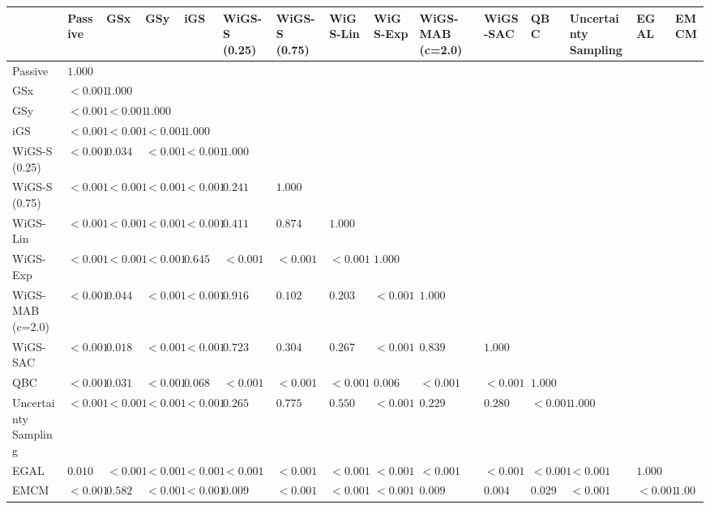 \begin{tabular}{lllllllllllllll}
\toprule
 & Passive & GSx & GSy & iGS & WiGS-S (0.25) & WiGS-S (0.75) & WiGS-Lin & WiGS-Exp & WiGS-MAB (c=2.0) & WiGS-SAC & QBC & Uncertainty Sampling & EGAL & EMCM \\
\midrule
Passive & $1.000$ &  &  &  &  &  &  &  &  &  &  &  &  &  \\
GSx & $<0.001$ & $1.000$ &  &  &  &  &  &  &  &  &  &  &  &  \\
GSy & $<0.001$ & $<0.001$ & $1.000$ &  &  &  &  &  &  &  &  &  &  &  \\
iGS & $<0.001$ & $<0.001$ & $<0.001$ & $1.000$ &  &  &  &  &  &  &  &  &  &  \\
WiGS-S (0.25) & $<0.001$ & $0.034$ & $<0.001$ & $<0.001$ & $1.000$ &  &  &  &  &  &  &  &  &  \\
WiGS-S (0.75) & $<0.001$ & $<0.001$ & $<0.001$ & $<0.001$ & $0.241$ & $1.000$ &  &  &  &  &  &  &  &  \\
WiGS-Lin & $<0.001$ & $<0.001$ & $<0.001$ & $<0.001$ & $0.411$ & $0.874$ & $1.000$ &  &  &  &  &  &  &  \\
WiGS-Exp & $<0.001$ & $<0.001$ & $<0.001$ & $0.645$ & $<0.001$ & $<0.001$ & $<0.001$ & $1.000$ &  &  &  &  &  &  \\
WiGS-MAB (c=2.0) & $<0.001$ & $0.044$ & $<0.001$ & $<0.001$ & $0.916$ & $0.102$ & $0.203$ & $<0.001$ & $1.000$ &  &  &  &  &  \\
WiGS-SAC & $<0.001$ & $0.018$ & $<0.001$ & $<0.001$ & $0.723$ & $0.304$ & $0.267$ & $<0.001$ & $0.839$ & $1.000$ &  &  &  &  \\
QBC & $<0.001$ & $0.031$ & $<0.001$ & $0.068$ & $<0.001$ & $<0.001$ & $<0.001$ & $0.006$ & $<0.001$ & $<0.001$ & $1.000$ &  &  &  \\
Uncertainty Sampling & $<0.001$ & $<0.001$ & $<0.001$ & $<0.001$ & $0.265$ & $0.775$ & $0.550$ & $<0.001$ & $0.229$ & $0.280$ & $<0.001$ & $1.000$ &  &  \\
EGAL & $0.010$ & $<0.001$ & $<0.001$ & $<0.001$ & $<0.001$ & $<0.001$ & $<0.001$ & $<0.001$ & $<0.001$ & $<0.001$ & $<0.001$ & $<0.001$ & $1.000$ &  \\
EMCM & $<0.001$ & $0.582$ & $<0.001$ & $<0.001$ & $0.009$ & $<0.001$ & $<0.001$ & $<0.001$ & $0.009$ & $0.004$ & $0.029$ & $<0.001$ & $<0.001$ & $1.000$ \\
\bottomrule
\end{tabular}
